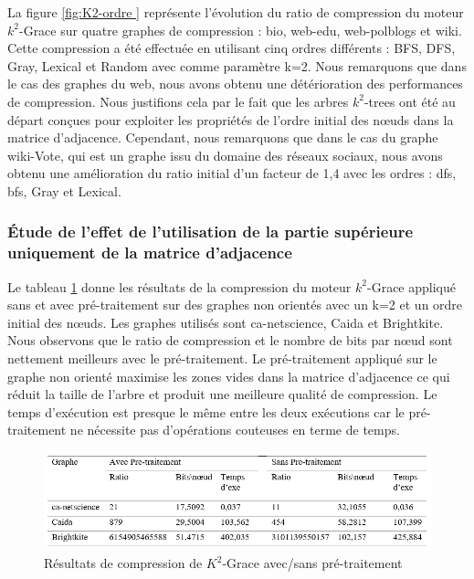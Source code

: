 La figure \ref{fig:K2-ordre } représente l'évolution du ratio de compression du moteur $k^2$-Grace sur quatre graphes de compression : bio, web-edu, web-polblogs et wiki. Cette compression a été effectuée en utilisant cinq ordres différents : BFS, DFS, Gray, Lexical et Random avec comme paramètre k=2. Nous remarquons que dans le cas des graphes du web, nous avons obtenu une détérioration des performances de compression. Nous justifions cela par le fait que les arbres $k^2$-trees ont été au départ conçues pour exploiter les propriétés de l'ordre initial des nœuds dans la matrice d'adjacence. Cependant, nous remarquons que dans le cas du graphe wiki-Vote, qui est un graphe issu du domaine des réseaux sociaux, nous avons obtenu une amélioration du ratio initial d'un facteur de 1,4 avec les ordres : \gls{dfs}, \gls{bfs}, Gray et Lexical. 


\subsubsection{Étude de l'effet de l'utilisation de la partie supérieure uniquement de la matrice d'adjacence}


Le tableau \ref{fig:tab-pret } donne les résultats de la compression du moteur $k^2$-Grace appliqué sans et avec pré-traitement sur des graphes non orientés avec un k=2 et un ordre initial des nœuds. Les graphes utilisés sont ca-netscience, Caida et Brightkite. 
Nous observons que le ratio de compression et le nombre de bits par nœud sont nettement meilleurs avec le pré-traitement. Le pré-traitement appliqué sur le graphe non orienté maximise les zones vides dans la matrice d'adjacence ce qui réduit la taille de l'arbre et produit une meilleure qualité de compression. Le temps d'exécution est presque le même entre les deux exécutions car le pré-traitement ne nécessite pas d'opérations couteuses en terme de temps.  

\begin{figure}[H]
	\centering
	\includegraphics[scale=1]{ressources/image/Tests/tab-pret.png}
	\caption{Résultats de compression de $K^2$-Grace avec/sans pré-traitement}
	\label{fig:tab-pret }
\end{figure}


